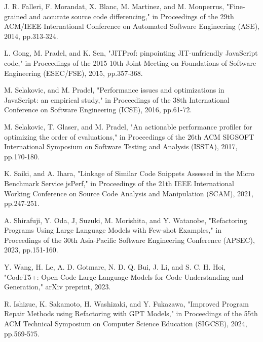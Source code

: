 \documentclass[11pt]{jreport}
\begin{document}






\begin{thebibliography}{99}


    J. R. Falleri, F. Morandat, X. Blanc, M. Martinez, and M. Monperrus,
    "Fine-grained and accurate source code differencing,"
    in Proceedings of the 29th ACM/IEEE International Conference on Automated Software Engineering (ASE),
    2014,
    pp.313-324.

    L. Gong, M. Pradel, and K. Sen,
    "JITProf: pinpointing JIT-unfriendly JavaScript code,"
    in Proceedings of the 2015 10th Joint Meeting on Foundations of Software Engineering (ESEC/FSE),
    2015,
    pp.357-368.

    M. Selakovic, and M. Pradel,
    "Performance issues and optimizations in JavaScript: an empirical study,"
    in Proceedings of the 38th International Conference on Software Engineering (ICSE),
    2016,
    pp.61-72.

    M. Selakovic, T. Glaser, and M. Pradel,
    "An actionable performance profiler for optimizing the order of evaluations,"
    in Proceedings of the 26th ACM SIGSOFT International Symposium on Software Testing and Analysis (ISSTA),
    2017,
    pp.170-180.

    K. Saiki, and A. Ihara,
    "Linkage of Similar Code Snippets Assessed in the Micro Benchmark Service jsPerf,"
    in Proceedings of the 21th IEEE International Working Conference on Source Code Analysis and Manipulation (SCAM),
    2021,
    pp.247-251.

    A. Shirafuji, Y. Oda, J, Suzuki, M. Morishita, and Y. Watanobe,
    "Refactoring Programs Using Large Language Models with Few-shot Examples,"
    in Proceedings of the 30th Asia-Pacific Software Engineering Conference (APSEC),
    2023,
    pp.151-160.

    Y. Wang, H. Le, A. D. Gotmare, N. D. Q. Bui, J. Li, and S. C. H. Hoi,
    "CodeT5+: Open Code Large Language Models for Code Understanding and Generation,"
    arXiv preprint,
    2023.

    R. Ishizue, K. Sakamoto, H. Washizaki, and Y. Fukazawa,
    "Improved Program Repair Methods using Refactoring with GPT Models,"
    in Proceedings of the 55th ACM Technical Symposium on Computer Science Education (SIGCSE),
    2024,
    pp.569-575.


\end{thebibliography}
\end{document}
